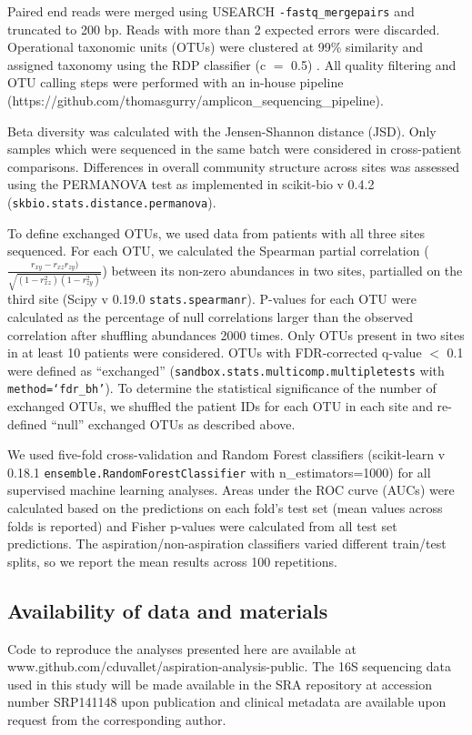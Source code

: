 Paired end reads were merged using USEARCH \texttt{-fastq\_mergepairs} and truncated to 200 bp.
Reads with more than 2 expected errors were discarded.
Operational taxonomic units (OTUs) were clustered at 99\% similarity and assigned taxonomy using the RDP classifier (c $=$ 0.5) \cite{wang2007rdp}.
All quality filtering and OTU calling steps were performed with an in-house pipeline \\ (https://github.com/thomasgurry/amplicon\_sequencing\_pipeline).

Beta diversity was calculated with the Jensen-Shannon distance (JSD).
Only samples which were sequenced in the same batch were considered in cross-patient comparisons.
Differences in overall community structure across sites was assessed using the PERMANOVA test as implemented in scikit-bio v 0.4.2 (\texttt{skbio.stats.distance.permanova}).

To define exchanged OTUs, we used data from patients with all three sites sequenced.
For each OTU, we calculated the Spearman partial correlation ($\frac{r_{xy} - r_{xz}r_{zy})}{\sqrt{(1 - r_{xz}^2)(1 - r_{zy}^2)}}$) between its non-zero abundances in two sites, partialled on the third site (Scipy v 0.19.0 \texttt{stats.spearmanr}).
P-values for each OTU were calculated as the percentage of null correlations larger than the observed correlation after shuffling abundances 2000 times.
Only OTUs present in two sites in at least 10 patients were considered.
OTUs with FDR-corrected q-value $<$ 0.1 were defined as ``exchanged'' (\texttt{sandbox.stats.multicomp.multipletests} with \texttt{method=`fdr\_bh'}).
To determine the statistical significance of the number of exchanged OTUs, we shuffled the patient IDs for each OTU in each site and re-defined ``null'' exchanged OTUs as described above.

We used five-fold cross-validation and Random Forest classifiers (scikit-learn v 0.18.1 \newline \texttt{ensemble.RandomForestClassifier} with n\_estimators=1000) for all supervised machine learning analyses.
Areas under the ROC curve (AUCs) were calculated based on the predictions on each fold's test set (mean values across folds is reported) and Fisher p-values were calculated from all test set predictions.
The aspiration/non-aspiration classifiers varied different train/test splits, so we report the mean results across 100 repetitions.

\subsection{Availability of data and materials}
Code to reproduce the analyses presented here are available at www.github.com/cduvallet/aspiration-analysis-public.
The 16S sequencing data used in this study will be made available in the SRA repository at accession number SRP141148 upon publication and clinical metadata are available upon request from the corresponding author.

